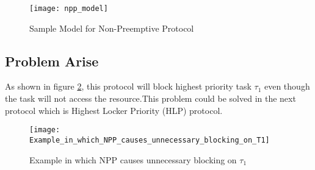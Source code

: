 \begin{figure}[h]
    \centering
    \texttt{[image: npp\_model]}
    \caption{Sample Model for Non-Preemptive Protocol \cite{b6}}
    \label{fig:npp_model}
\end{figure}

\subsection{Problem Arise}

As shown in figure \ref{fig:Example_in_which_NPP_causes_unnecessary_blocking_on_T1}, this protocol will block highest priority task $ \tau_{1} $ even though the task will not access the resource.This problem could be solved in the next protocol which is Highest Locker Priority (HLP) protocol.

\begin{figure}[h]
    \centering
    \texttt{[image: Example\_in\_which\_NPP\_causes\_unnecessary\_blocking\_on\_T1]}
    \caption{Example in which NPP causes unnecessary blocking on $ \tau_{1} $ \cite{b5}}
    \label{fig:Example_in_which_NPP_causes_unnecessary_blocking_on_T1}
\end{figure}



 
